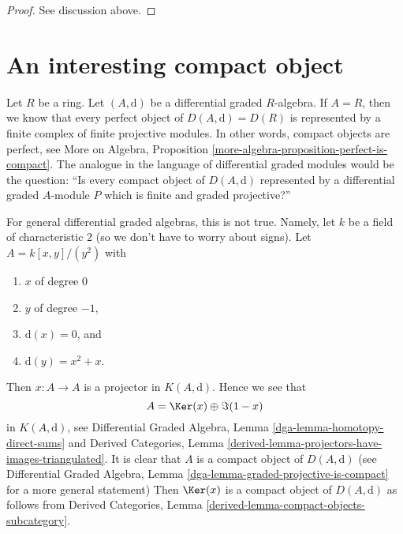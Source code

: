 \begin{proof}
See discussion above.
\end{proof}




\section{An interesting compact object}
\label{section-interesting-compact}


\noindent
Let $R$ be a ring. Let $(A, \text{d})$ be a differential graded $R$-algebra.
If $A = R$, then we know that every perfect object of $D(A, \text{d}) = D(R)$
is represented by a finite complex of finite projective modules. In other
words, compact objects are perfect, see
More on Algebra, Proposition \ref{more-algebra-proposition-perfect-is-compact}.
The analogue in the language of differential graded modules would
be the question: ``Is every compact object of $D(A, \text{d})$ represented
by a differential graded $A$-module $P$ which is finite and
graded projective?''

\medskip\noindent
For general differential graded algebras, this is not true. Namely,
let $k$ be a field of characteristic $2$
(so we don't have to worry about signs).
Let $A = k[x, y]/(y^2)$
with
\begin{enumerate}
\item $x$ of degree $0$
\item $y$ of degree $-1$,
\item $\text{d}(x) = 0$, and
\item $\text{d}(y) = x^2 + x$.
\end{enumerate}
Then $x : A \to A$ is a projector in $K(A, \text{d})$.
Hence we see that
$$
A = \Ker(x) \oplus \Im(1 - x)
$$
in $K(A, \text{d})$, see
Differential Graded Algebra, Lemma \ref{dga-lemma-homotopy-direct-sums} and
Derived Categories, Lemma
\ref{derived-lemma-projectors-have-images-triangulated}.
It is clear that $A$ is a compact object of $D(A, \text{d})$
(see Differential Graded Algebra, Lemma
\ref{dga-lemma-graded-projective-is-compact} for
a more general statement)
Then $\Ker(x)$ is a compact object of $D(A, \text{d})$
as follows from
Derived Categories, Lemma \ref{derived-lemma-compact-objects-subcategory}.

